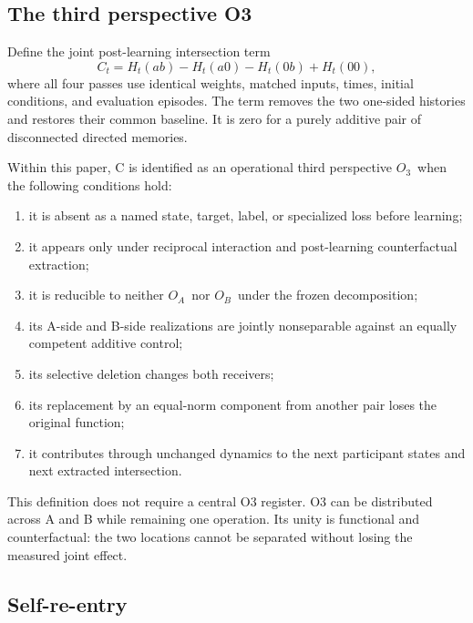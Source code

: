 \documentclass[11pt,a4paper]{article}
\newcommand{\OA}{\ensuremath{O_{A}}}
\newcommand{\OB}{\ensuremath{O_{B}}}
\newcommand{\Othree}{\ensuremath{O_{3}}}
\begin{document}
\subsection{The third perspective O3}

Define the joint post-learning intersection term
\begin{equation}
 C_t=H_t(ab)-H_t(a0)-H_t(0b)+H_t(00),
 \label{eq:joint}
\end{equation}
where all four passes use identical weights, matched inputs, times, initial conditions, and evaluation episodes. The term removes the two one-sided histories and restores their common baseline. It is zero for a purely additive pair of disconnected directed memories.

Within this paper, C is identified as an operational third perspective \Othree\ when the following conditions hold:
\begin{enumerate}
  \item it is absent as a named state, target, label, or specialized loss before learning;
  \item it appears only under reciprocal interaction and post-learning counterfactual extraction;
  \item it is reducible to neither \OA\ nor \OB\ under the frozen decomposition;
  \item its A-side and B-side realizations are jointly nonseparable against an equally competent additive control;
  \item its selective deletion changes both receivers;
  \item its replacement by an equal-norm component from another pair loses the original function;
  \item it contributes through unchanged dynamics to the next participant states and next extracted intersection.
\end{enumerate}

This definition does not require a central O3 register. O3 can be distributed across A and B while remaining one operation. Its unity is functional and counterfactual: the two locations cannot be separated without losing the measured joint effect.

\subsection{Self-re-entry}
\end{document}
